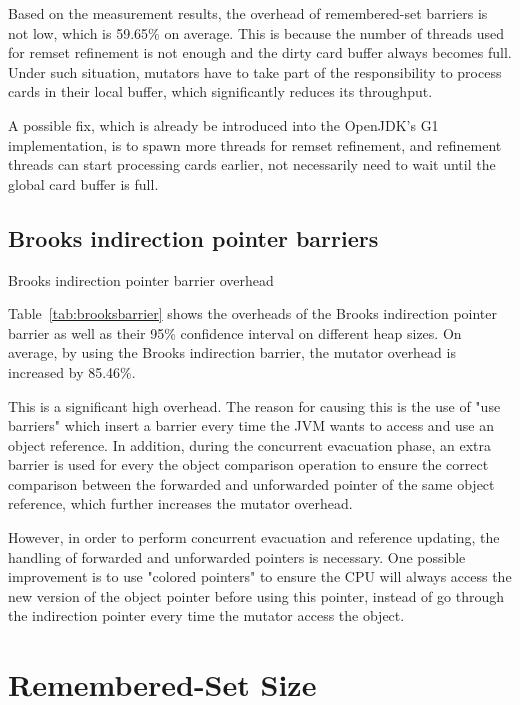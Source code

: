 Based on the measurement results, the overhead of remembered-set barriers is not low,
which is 59.65\% on average. This is because the number of threads used for remset refinement
is not enough and the dirty card buffer always becomes full. Under such situation,
mutators have to take part of the responsibility to process cards in their local buffer,
which significantly reduces its throughput.

A possible fix, which is already be introduced into the OpenJDK's G1 implementation, is
to spawn more threads for remset refinement, and refinement threads can start processing cards earlier,
not necessarily need to wait until the global card buffer is full.

\subsection{Brooks indirection pointer barriers}

\begin{table*}
  \centering
  
  \caption{Brooks indirection pointer barrier overhead}
  \label{tab:brooksbarrier}
\end{table*}

Table~\ref{tab:brooksbarrier} shows the overheads of the Brooks indirection pointer barrier
as well as their 95\% confidence interval on different heap sizes.
On average, by using the Brooks indirection barrier, the mutator overhead
is increased by 85.46\%.

This is a significant high overhead. The reason for causing this is the use of 
"use barriers" which insert a barrier every time the JVM wants to access and use
an object reference. In addition, during the concurrent evacuation phase,
an extra barrier is used for every the object comparison operation
to ensure the correct comparison between the forwarded and unforwarded pointer of the same object reference,
which further increases the mutator overhead.

However, in order to perform concurrent evacuation and reference updating, the handling
of forwarded and unforwarded pointers is necessary.
One possible improvement is to use "colored pointers" to ensure the CPU will always access
the new version of the object pointer before using this pointer,
instead of go through the indirection pointer every time the mutator access the object.


\section{Remembered-Set Size} %
\label{sec:remsetsize}

